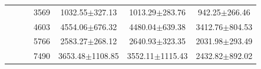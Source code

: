 \begin{table}[t]
\begin{tabular}{ccccccc}
                          &                       &                                 & 3569        & 1032.55$\pm$327.13                                                             & 1013.29$\pm$283.76                                                         & 942.25$\pm$266.46                                                          \\
                          &                       &                                 & 4603        & 4554.06$\pm$676.32                                                             & 4480.04$\pm$639.38                                                         & 3412.76$\pm$804.53                                                         \\
                          &                       &                                 & 5766        & 2583.27$\pm$268.12                                                             & 2640.93$\pm$323.35                                                         & 2031.98$\pm$293.49                                                         \\
                          &                       &                                 & 7490        & 3653.48$\pm$1108.85                                                            & 3552.11$\pm$1115.43                                                        & 2432.82$\pm$892.02                                                         \\
    \bottomrule
    \end{tabular}

\end{table}
